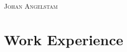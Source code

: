 \documentclass[a4paper, oneside, final]{scrartcl} %
\begin{document}
\begin{center} %


{\fontsize{36}{36}\selectfont\scshape
  Johan Angelstam} %

\vspace{1.2cm} %





\section{Work Experience}


\end{center}
\end{document}
